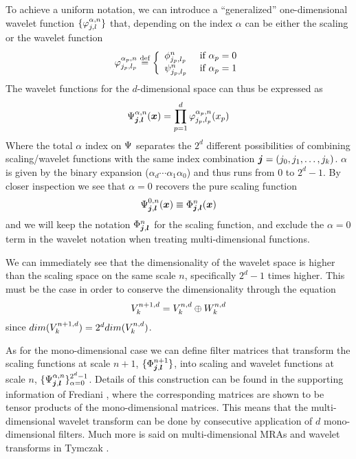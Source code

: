 To achieve a uniform notation, we can introduce a ``generalized'' one-dimensional
wavelet function $\lbrace\varphi_{j,l}^{\alpha,n}\rbrace$ that, depending on 
the index $\alpha$ can be either the scaling or the wavelet function
\begin{equation}
    \varphi^{\alpha_p,n}_{j_p,l_p} \stackrel{\text{def}}{\hbox{=}} 
    \left\{
	\begin{array}{lll}
	    \phi^n_{j_p,l_p}	&\mbox{ if }\alpha_p = 0\\
	    \psi^n_{j_p,l_p}	&\mbox{ if }\alpha_p = 1
	\end{array}
    \right.
\end{equation}
The wavelet functions for the $d$-dimensional space can thus be expressed as
\begin{equation}
    \Psi^{\alpha,n}_{\boldsymbol j, \boldsymbol l}(\boldsymbol x) =
    \prod_{p=1}^d\varphi^{\alpha_p,n}_{j_p,l_p}(x_p)
\end{equation}
Where the total $\alpha$ index on $\Psi$ separates the $2^d$ different
possibilities of combining scaling/wavelet functions with the same index
combination $\boldsymbol j = (j_0,j_1,\dots,j_k)$. $\alpha$ is given by the 
binary expansion ($\alpha_d\cdots\alpha_1\alpha_0$) and thus runs from $0$ 
to $2^d-1$. By closer inspection we see that $\alpha=0$ recovers the pure 
scaling function
\begin{equation}
    \Psi^{0,n}_{\boldsymbol j,\boldsymbol l}(\boldsymbol x) \equiv
    \Phi^n_{\boldsymbol j,\boldsymbol l}(\boldsymbol x)
\end{equation}
and we will keep the notation $\Phi^n_{\boldsymbol j,\boldsymbol l}$ for the
scaling function, and exclude the $\alpha=0$ term in the wavelet notation
when treating multi-dimensional functions.

We can immediately see that the dimensionality of the wavelet space is higher
than the scaling space on the same scale $n$, specifically $2^d-1$ times
higher. This must be the case in order to conserve the 
dimensionality through the equation
\begin{equation}
    {V}_{k}^{n+1,d} = {V}_{k}^{n,d} \oplus {W}_{k}^{n,d}
\end{equation}
since $dim({V}_{k}^{n+1,d}) = 2^d dim({V}_{k}^{n,d})$.

As for the mono-dimensional case we can define filter matrices that transform
the scaling functions at scale $n+1$, 
$\lbrace\Phi^{n+1}_{\boldsymbol j,\boldsymbol l}\rbrace$, 
into scaling and wavelet functions at scale $n$, 
$\lbrace\Psi^{\alpha,n}_{\boldsymbol j,\boldsymbol l}\rbrace_{\alpha=0}^{2^d-1}$. 
Details of this construction can be found in the supporting information of
Frediani \etal\cite{Frediani:2013p1143}, where the corresponding matrices are 
shown to be tensor products of the mono-dimensional matrices. This means that 
the multi-dimensional wavelet transform can be done by consecutive application 
of $d$ mono-dimensional filters. Much more is said on multi-dimensional MRAs
and wavelet transforms in Tymczak \etal\cite{Tymczak:2002}.

